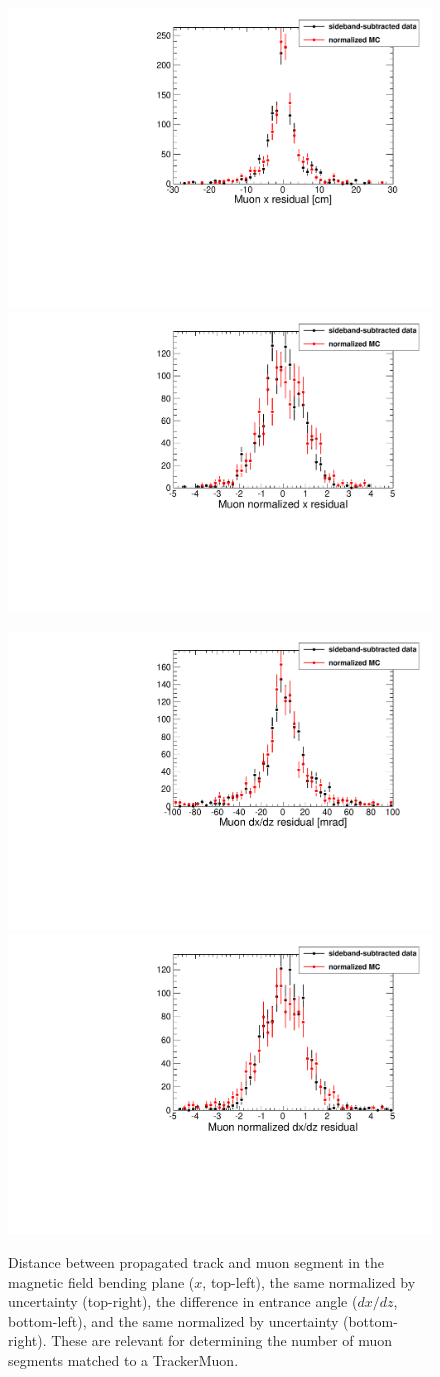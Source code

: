 \documentclass[12pt]{article}
\begin{document}
\begin{figure}
\includegraphics[width=0.5\linewidth]{phi_st1x.pdf}
\includegraphics[width=0.5\linewidth]{phi_st1xsig.pdf}

\includegraphics[width=0.5\linewidth]{phi_st1dxdz.pdf}
\includegraphics[width=0.5\linewidth]{phi_st1dxdzsig.pdf}

\caption{Distance between propagated track and muon segment in the
  magnetic field bending plane ($x$, top-left), the same normalized by
  uncertainty (top-right), the difference in entrance angle ($dx/dz$,
  bottom-left), and the same normalized by uncertainty (bottom-right).
  These are relevant for determining the number of muon segments
  matched to a TrackerMuon. \label{fig:phi_residuals}}
\end{figure}
\end{document}
